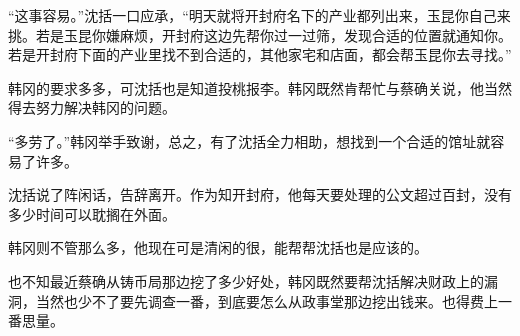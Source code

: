 “这事容易。”沈括一口应承，“明天就将开封府名下的产业都列出来，玉昆你自己来挑。若是玉昆你嫌麻烦，开封府这边先帮你过一过筛，发现合适的位置就通知你。若是开封府下面的产业里找不到合适的，其他家宅和店面，都会帮玉昆你去寻找。”

韩冈的要求多多，可沈括也是知道投桃报李。韩冈既然肯帮忙与蔡确关说，他当然得去努力解决韩冈的问题。

“多劳了。”韩冈举手致谢，总之，有了沈括全力相助，想找到一个合适的馆址就容易了许多。

沈括说了阵闲话，告辞离开。作为知开封府，他每天要处理的公文超过百封，没有多少时间可以耽搁在外面。

韩冈则不管那么多，他现在可是清闲的很，能帮帮沈括也是应该的。

也不知最近蔡确从铸币局那边挖了多少好处，韩冈既然要帮沈括解决财政上的漏洞，当然也少不了要先调查一番，到底要怎么从政事堂那边挖出钱来。也得费上一番思量。

